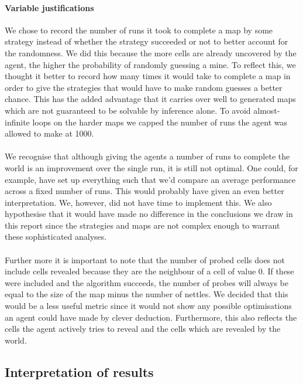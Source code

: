 \documentclass[british]{article}
\begin{document}
\paragraph{Variable justifications}We chose to record the number of runs it took to complete a map by some strategy instead of whether the strategy succeeded or not to better account for the randomness. We did this because the more cells are already uncovered by the agent, the higher the probability of randomly guessing a mine. To reflect this, we thought it better to record how many times it would take to complete a map in order to give the strategies that would have to make random guesses a better chance. This has the added advantage that it carries over well to generated maps which are not guaranteed to be solvable by inference alone. To avoid almost-infinite loops on the harder maps we capped the number of runs the agent was allowed to make at 1000.
\paragraph{} We recognise that although giving the agents a number of runs to complete the world is an improvement over the single run, it is still not optimal. One could, for example, have set up everything such that we'd compare an average performance across a fixed number of runs. This would probably have given an even better interpretation. We, however, did not have time to implement this. We also hypothesise that it would have made no difference in the conclusions we draw in this report since the strategies and maps are not complex enough to warrant these sophisticated analyses.
\paragraph{}Further more it is important to note that the number of probed cells does not include cells revealed because they are the neighbour of a cell of value 0. If these were included and the algorithm succeeds, the number of probes will always be equal to the size of the map minus the number of nettles. We decided that this would be a less useful metric since it would not show any possible optimisations an agent could have made by clever deduction. Furthermore, this also reflects the cells the agent actively tries to reveal and the cells which are revealed by the world.

\subsection{Interpretation of results}
\label{interpretation}
\end{document}
